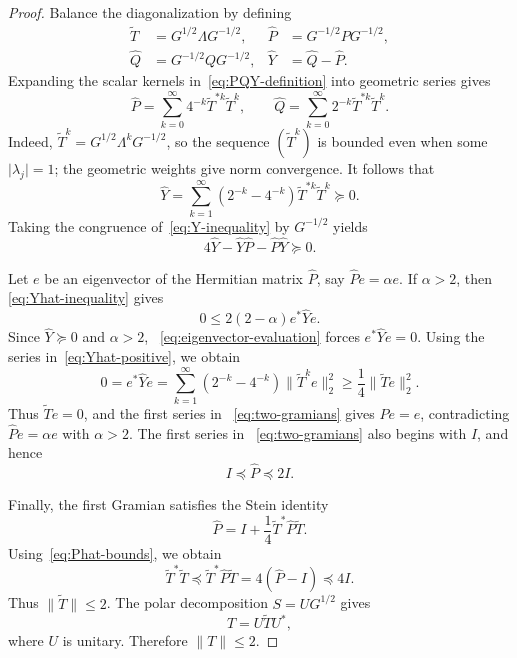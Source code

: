 \documentclass{aomart}
\theoremstyle{definition}
\begin{document}
\begin{proof}
Balance the diagonalization by defining
\begin{equation}
\begin{aligned}
  \widetilde T&=G^{1/2}\Lambda G^{-1/2},
  &\widehat P&=G^{-1/2}PG^{-1/2},\\
  \widehat Q&=G^{-1/2}QG^{-1/2},
  &\widehat Y&=\widehat Q-\widehat P.
\end{aligned}
\label{eq:balanced-definitions}
\end{equation}
Expanding the scalar kernels in~\eqref{eq:PQY-definition} into
geometric series gives
\begin{equation}
  \widehat P=\sum_{k=0}^{\infty}
  4^{-k}\widetilde T^{*k}\widetilde T^k,
  \qquad
  \widehat Q=\sum_{k=0}^{\infty}
  2^{-k}\widetilde T^{*k}\widetilde T^k.
  \label{eq:two-gramians}
\end{equation}
Indeed, $\widetilde T^k=G^{1/2}\Lambda^k G^{-1/2}$, so the sequence
$(\widetilde T^k)$ is bounded even when some
$\lvert\lambda_j\rvert=1$; the
geometric weights give norm convergence.  It follows that
\begin{equation}
  \widehat Y=
  \sum_{k=1}^{\infty}(2^{-k}-4^{-k})
  \widetilde T^{*k}\widetilde T^k\succeq0.
  \label{eq:Yhat-positive}
\end{equation}
Taking the congruence of~\eqref{eq:Y-inequality} by $G^{-1/2}$ yields
\begin{equation}
  4\widehat Y-\widehat Y\widehat P
  -\widehat P\widehat Y\succeq0.
  \label{eq:Yhat-inequality}
\end{equation}

Let $e$ be an eigenvector of the Hermitian matrix $\widehat P$, say
$\widehat Pe=\alpha e$.  If $\alpha>2$, then~%
\eqref{eq:Yhat-inequality} gives
\begin{equation}
  0\leq2(2-\alpha)e^*\widehat Ye.
  \label{eq:eigenvector-evaluation}
\end{equation}
Since $\widehat Y\succeq0$ and $\alpha>2$,~%
\eqref{eq:eigenvector-evaluation} forces $e^*\widehat Ye=0$.  Using the
series in~\eqref{eq:Yhat-positive}, we obtain
\[
  0=e^*\widehat Ye
  =\sum_{k=1}^{\infty}(2^{-k}-4^{-k})
    \lVert\widetilde T^k e\rVert_2^2
  \geq\frac14\lVert\widetilde Te\rVert_2^2.
\]
Thus $\widetilde Te=0$, and the first series in~%
\eqref{eq:two-gramians} gives $\widehat Pe=e$, contradicting
$\widehat Pe=\alpha e$ with $\alpha>2$.  The first series in~%
\eqref{eq:two-gramians} also begins with $I$, and hence
\begin{equation}
  I\preceq\widehat P\preceq2I.
  \label{eq:Phat-bounds}
\end{equation}

Finally, the first Gramian satisfies the Stein identity
\begin{equation}
  \widehat P
  =I+\frac14\widetilde T^*\widehat P\widetilde T.
  \label{eq:stein-identity}
\end{equation}
Using~\eqref{eq:Phat-bounds}, we obtain
\[
  \widetilde T^*\widetilde T
  \preceq \widetilde T^*\widehat P\widetilde T
  =4(\widehat P-I)\preceq4I.
\]
Thus $\lVert\widetilde T\rVert\leq2$.  The polar decomposition
$S=UG^{1/2}$ gives
\[
  T=U\widetilde TU^*,
\]
where $U$ is unitary.  Therefore $\lVert T\rVert\leq2$.
\end{proof}
\end{document}
